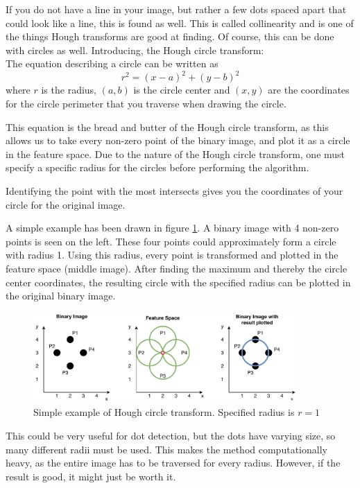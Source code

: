 If you do not have a line in your image, but rather a few dots spaced apart that could look like a line, this is found as well. This is called collinearity and is one of the things Hough transforms are good at finding. Of course, this can be done with circles as well. Introducing, the Hough circle transform: \\

The equation describing a circle can be written as
\begin{equation}
    r^2 = (x-a)^2+(y-b)^2
\end{equation}
where $r$ is the radius, $(a,b)$ is the circle center and $(x,y)$ are the coordinates for the circle perimeter that you traverse when drawing the circle. 

This equation is the bread and butter of the Hough circle transform, as this allows us to take every non-zero point of the binary image, and plot it as a circle in the feature space. Due to the nature of the Hough circle transform, one must specify a specific radius for the circles before performing the algorithm. 

Identifying the point with the most intersects gives you the coordinates of your circle for the original image. 

A simple example has been drawn in figure \ref{fig:houghcircleexample}. A binary image with 4 non-zero points is seen on the left. These four points could approximately form a circle with radius 1. Using this radius, every point is transformed and plotted in the feature space (middle image). After finding the maximum and thereby the circle center coordinates, the resulting circle with the specified radius can be plotted in the original binary image. 
\begin{figure}[h]
    \centering
    \includegraphics[width=0.9\textwidth]{figures/ImageAnalysis/HoughCircle/HoughCircle.pdf}
    \caption{Simple example of Hough circle transform. Specified radius is $r=1$ }
    \label{fig:houghcircleexample}
\end{figure}
\FloatBarrier
This could be very useful for dot detection, but the dots have varying size, so many different radii must be used. This makes the method computationally heavy, as the entire image has to be traversed for every radius. However, if the result is good, it might just be worth it. \\

